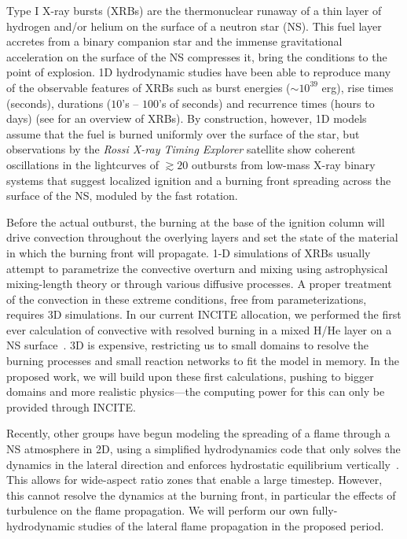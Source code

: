 Type I X-ray bursts (XRBs) are the thermonuclear runaway of a thin
layer of hydrogen and/or helium on the surface of a neutron star (NS).
This fuel layer accretes from a binary companion star and the immense
gravitational acceleration on the surface of the NS compresses it,
bring the conditions to the point of explosion.  1D hydrodynamic
studies have been able to reproduce many of the observable features of
XRBs such as burst energies ($\sim 10^{39}$ erg), rise times
(seconds), durations ($10$'s -- $100$'s of seconds) and recurrence
times (hours to days) (see \cite{STRO_BILD06} for an overview of
XRBs).  By construction, however, 1D models assume that the fuel is
burned uniformly over the surface of the star, but observations
by the {\em Rossi X-ray Timing Explorer} satellite show coherent
oscillations in the lightcurves of $\gtrsim 20$ outbursts from
low-mass X-ray binary systems that suggest localized ignition
and a burning front spreading across the surface of the NS, moduled
by the fast rotation.

Before the actual outburst, the burning at the base of the ignition
column will drive convection throughout the overlying layers and set
the state of the material in which the burning front will propagate.
1-D simulations of XRBs usually attempt to parametrize the convective
overturn and mixing using astrophysical mixing-length theory or
through various diffusive processes.  A proper treatment of the
convection in these extreme conditions, free from parameterizations,
requires 3D simulations.  In our current INCITE allocation, we
performed the first ever calculation of convective with resolved
burning in a mixed H/He layer on a NS surface~\cite{xrb-3d}.  3D is
expensive, restricting us to small domains to resolve the burning
processes and small reaction networks to fit the model in memory.  In
the proposed work, we will build upon these first calculations,
pushing to bigger domains and more realistic physics---the computing
power for this can only be provided through INCITE.  

Recently, other groups have begun modeling the spreading of a flame
through a NS atmosphere in 2D, using a simplified hydrodynamics code
that only solves the dynamics in the lateral direction and enforces
hydrostatic equilibrium vertically~\cite{cavecchi:2013}.  This allows
for wide-aspect ratio zones that enable a large timestep.  However,
this cannot resolve the dynamics at the burning front, in particular
the effects of turbulence on the flame propagation.  We will perform
our own fully-hydrodynamic studies of the lateral flame propagation in
the proposed period.

